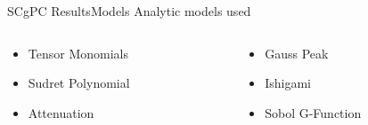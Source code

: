\documentclass{beamer}
\begin{document}
\begin{frame}{SCgPC Results}{Models}\vspace{-20pt}
  \vfill
  Analytic models used
  \vfill
  \begin{columns}
    \begin{column}{0.5\textwidth}
  \vfill
      \begin{itemize}
        \item Tensor Monomials
  \vfill
        \item Sudret Polynomial
  \vfill
        \item Attenuation
      \end{itemize}
  \vfill
    \end{column}
    \begin{column}{0.5\textwidth}
  \vfill
      \begin{itemize}
        \item Gauss Peak
  \vfill
        \item Ishigami
  \vfill
        \item Sobol G-Function
      \end{itemize}
  \vfill
    \end{column}
  \end{columns}
  \vfill
\end{frame}
\end{document}
